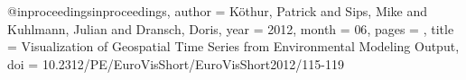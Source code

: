 @inproceedings{inproceedings,
author = {Köthur, Patrick and Sips, Mike and Kuhlmann, Julian and Dransch, Doris},
year = {2012},
month = {06},
pages = {},
title = {Visualization of Geospatial Time Series from Environmental Modeling Output},
doi = {10.2312/PE/EuroVisShort/EuroVisShort2012/115-119}
}
